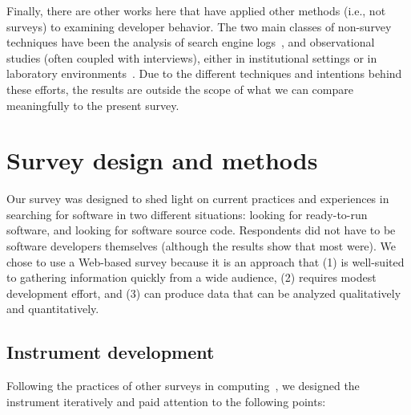 \documentclass[review]{elsarticle}
\begin{document}
Finally, there are other works here that have applied other methods (i.e., not surveys) to examining developer behavior.  The two main classes of non-survey techniques have been the analysis of search engine logs~\citep{bajrachary_2009, bajracharya2012analyzing, jansen_2006, teevan_2004, brandt2009two, brandt2010example, Li2009751, ge2014developers, volske2015users}, and observational studies (often coupled with interviews), either in institutional settings or in laboratory environments~\citep{sim_2011, brandt2009two, banker1993repository, gallardo2013software, sherif2003barriers, pohthong2001reuse, sim2013controlled, murphyhill2015how, sim2011getting, dabbish_2012}.  Due to the different techniques and intentions behind these efforts, the results are outside the scope of what we can compare meaningfully to the present survey.


\section{Survey design and methods}
\label{methods}

Our survey was designed to shed light on current practices and experiences in searching for software in two different situations: looking for ready-to-run software, and looking for software source code.  Respondents did not have to be software developers themselves (although the results show that most were).  We chose to use a Web-based survey because it is an approach that (1) is well-suited to gathering information quickly from a wide audience, (2) requires modest development effort, and (3) can produce data that can be analyzed qualitatively and quantitatively.


\subsection{Instrument development}

Following the practices of other surveys in computing~\citep[e.g.,][]{varnellsarjeant2015comparing, kitchenham_2008}, we designed the instrument iteratively and paid attention to the following points:
\end{document}
